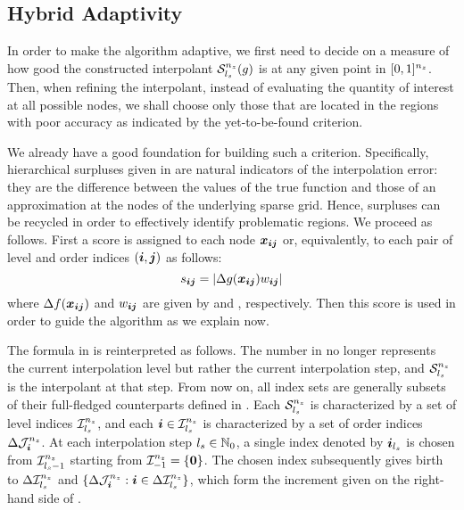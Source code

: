 \subsection{Hybrid Adaptivity}

In order to make the algorithm adaptive, we first need to decide on a measure of
how good the constructed interpolant $\mathcal{S}^{{n_{z}}}_{{l_{s}}}(g)$ is at any
given point in $[0, 1]^{n_{z}}$. Then, when refining the interpolant, instead of
evaluating the quantity of interest at all possible nodes, we shall choose only
those that are located in the regions with poor accuracy as indicated by the
yet-to-be-found criterion.

We already have a good foundation for building such a criterion. Specifically,
hierarchical surpluses given in  are natural
indicators of the interpolation error: they are the difference between the
values of the true function and those of an approximation at the nodes of the
underlying sparse grid. Hence, surpluses can be recycled in order to effectively
identify problematic regions. We proceed as follows. First a score is assigned
to each node $\boldsymbol{x}_{\boldsymbol{i} \boldsymbol{j}}$ or, equivalently, to each pair of level and order
indices $(\boldsymbol{i}, \boldsymbol{j})$ as follows:
\[
  s_{\boldsymbol{i} \boldsymbol{j}} = |\Delta g(\boldsymbol{x}_{\boldsymbol{i} \boldsymbol{j}}) w_{\boldsymbol{i} \boldsymbol{j}}|
\]
where $\Delta f(\boldsymbol{x}_{\boldsymbol{i} \boldsymbol{j}})$ and $w_{\boldsymbol{i}\boldsymbol{j}}$ are given by
 and ,
respectively. Then this score is used in order to guide the algorithm as we
explain now.

The formula in  is reinterpreted as follows. The number
\ls in  no longer represents the current interpolation
level but rather the current interpolation step, and $\mathcal{S}^{{n_{z}}}_{{l_{s}}}$ is
the interpolant at that step. From now on, all index sets are generally subsets
of their full-fledged counterparts defined in . Each
$\mathcal{S}^{{n_{z}}}_{{l_{s}}}$ is characterized by a set of level indices
$\mathcal{I}^{{n_{z}}}_{{l_{s}}}$, and each $\boldsymbol{i} \in \mathcal{I}^{{n_{z}}}_{{l_{s}}}$ is
characterized by a set of order indices $\Delta\mathcal{J}^{{n_{z}}}_{\boldsymbol{i}}$. At each
interpolation step ${l_{s}} \in \mathbb{N}_{0}$, a single index denoted by $\boldsymbol{i}_{{l_{s}}}$ is
chosen from $\mathcal{I}^{{n_{z}}}_{{l_{s}} - 1}$ starting from $\mathcal{I}^{{n_{z}}}_{-1} =
\{ \boldsymbol{0} \}$. The chosen index subsequently gives birth to
$\Delta\mathcal{I}^{{n_{z}}}_{{l_{s}}}$ and $\{ \Delta\mathcal{J}^{{n_{z}}}_{\boldsymbol{i}}: \boldsymbol{i} \in
\Delta\mathcal{I}^{{n_{z}}}_{{l_{s}}} \}$, which form the increment given on the
right-hand side of .


